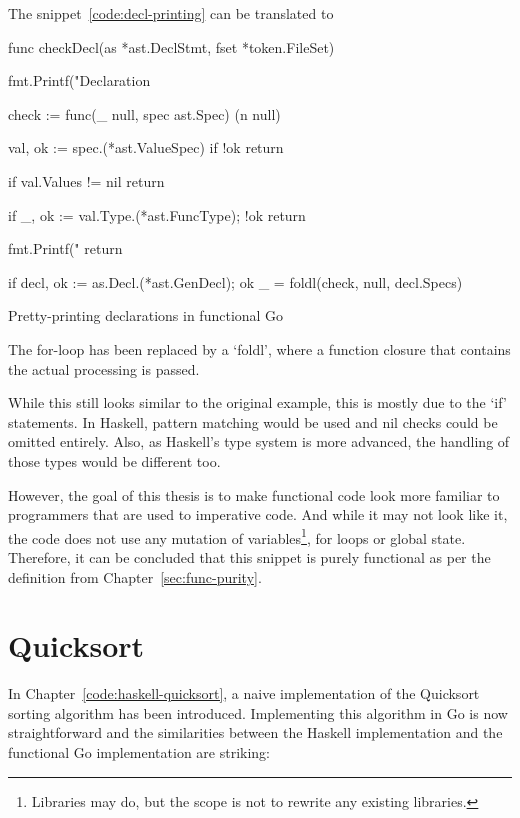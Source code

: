The snippet~\ref{code:decl-printing} can be translated to

\begin{code}
	\begin{gocode}
func checkDecl(as *ast.DeclStmt, fset *token.FileSet) {
	fmt.Printf("Declaration %

	check := func(_ null, spec ast.Spec) (n null) {
		val, ok := spec.(*ast.ValueSpec)
		if !ok {
			return
		}

		if val.Values != nil {
			return
		}

		if _, ok := val.Type.(*ast.FuncType); !ok {
			return
		}

		fmt.Printf("\tIdent %
		return
	}

	if decl, ok := as.Decl.(*ast.GenDecl); ok {
		_ = foldl(check, null{}, decl.Specs)
	}
}
\end{gocode}
	\caption{Pretty-printing declarations in functional Go}
\end{code}
The for-loop has been replaced by a `foldl', where a function closure
that contains the actual processing is passed.

While this still looks similar to the original example, this is mostly due to
the `if' statements. In Haskell, pattern matching would be used and nil checks
could be omitted entirely. Also, as Haskell's type system is more advanced, the
handling of those types would be different too.

However, the goal of this thesis is to make functional code look more familiar
to programmers that are used to imperative code.
And while it may not look like it, the code does not use any mutation of
variables\footnote{Libraries may do, but the scope is not to rewrite any existing
libraries.}, for loops or global state. Therefore, it can be concluded that this
snippet is purely functional as per the definition from Chapter~\ref{sec:func-purity}.

\section{Quicksort}

In Chapter~\ref{code:haskell-quicksort}, a naive implementation of the Quicksort sorting
algorithm has been introduced.
Implementing this algorithm in Go is now straightforward and the similarities between
the Haskell implementation and the functional Go implementation are striking:

